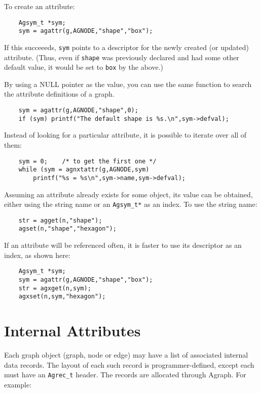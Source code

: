 \documentclass[11pt,letterpaper]{article}
\begin{document}
To create an attribute:

\begin{verbatim}
    Agsym_t *sym;
    sym = agattr(g,AGNODE,"shape","box");
\end{verbatim}

If this succeeeds, \verb"sym" points to a descriptor for the 
newly created (or updated) attribute.  (Thus, even if \verb"shape"
was previously declared and had some other default value,
it would be set to \verb"box" by the above.)

By using a NULL pointer as the value,
you can use the same function to search the attribute definitions of a graph.
\begin{verbatim}
    sym = agattr(g,AGNODE,"shape",0);
    if (sym) printf("The default shape is %s.\n",sym->defval);
\end{verbatim}

Instead of looking for a particular attribute, it is possible to
iterate over all of them:

\begin{verbatim}
    sym = 0;    /* to get the first one */
    while (sym = agnxtattr(g,AGNODE,sym)
    	printf("%s = %s\n",sym->name,sym->defval);
\end{verbatim}

Assuming an attribute already exists for some object, its value can be
obtained, either using the string name or an \verb"Agsym_t*" as an index.
To use the string name:

\begin{verbatim}
    str = agget(n,"shape");
    agset(n,"shape","hexagon");
\end{verbatim}

If an attribute will be referenced often, it is faster to
use its descriptor as an index, as shown here:

\begin{verbatim}
    Agsym_t *sym;
    sym = agattr(g,AGNODE,"shape","box");
    str = agxget(n,sym);
    agxset(n,sym,"hexagon");
\end{verbatim}

\section{Internal Attributes}
\label{sec:internalattributes}

Each graph object (graph, node or edge) may have a list of
associated internal data records.  The layout of each such
record is programmer-defined, except each must have an
\verb"Agrec_t" header.  The records are allocated through
Agraph.  For example:
\end{document}

